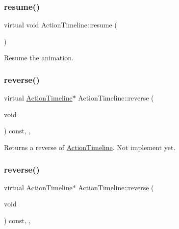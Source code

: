 \subsubsection{\texorpdfstring{resume()}{resume()}\hspace{0.1cm}{\footnotesize\ttfamily [2/2]}}
{\footnotesize\ttfamily virtual void Action\+Timeline\+::resume (\begin{DoxyParamCaption}{ }\end{DoxyParamCaption})\hspace{0.3cm}{\ttfamily [virtual]}}

Resume the animation. \mbox{\label{classActionTimeline_ad242317b6d9108b0840cf535ea760786}} 
\subsubsection{\texorpdfstring{reverse()}{reverse()}\hspace{0.1cm}{\footnotesize\ttfamily [1/2]}}
{\footnotesize\ttfamily virtual \hyperlink{classActionTimeline}{Action\+Timeline}$\ast$ Action\+Timeline\+::reverse (\begin{DoxyParamCaption}\item[{void}]{ }\end{DoxyParamCaption}) const\hspace{0.3cm}{\ttfamily [inline]}, {\ttfamily [override]}, {\ttfamily [virtual]}}

Returns a reverse of \hyperlink{classActionTimeline}{Action\+Timeline}. Not implement yet. \mbox{\label{classActionTimeline_ad242317b6d9108b0840cf535ea760786}} 
\subsubsection{\texorpdfstring{reverse()}{reverse()}\hspace{0.1cm}{\footnotesize\ttfamily [2/2]}}
{\footnotesize\ttfamily virtual \hyperlink{classActionTimeline}{Action\+Timeline}$\ast$ Action\+Timeline\+::reverse (\begin{DoxyParamCaption}\item[{void}]{ }\end{DoxyParamCaption}) const\hspace{0.3cm}{\ttfamily [inline]}, {\ttfamily [override]}, {\ttfamily [virtual]}}

